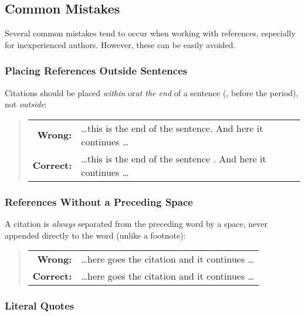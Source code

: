\subsection{Common Mistakes}

Several common mistakes tend to occur when working with references, especially
for inexperienced authors. However, these can be easily avoided.

\subsubsection{Placing References Outside Sentences}

Citations should be placed \emph{within} or\emph{at the end} of a sentence (\ie, before the
period), not \emph{outside}:
%
\begin{quote}
	\begin{tabular}{rl}
		\textbf{Wrong:}  & \ldots this is the end of the sentence.
		\cite{Oetiker2021} And here it continues \ldots \\
		\textbf{Correct:} & \ldots this is the end of the sentence
		\cite{Oetiker2021}. And here it continues \ldots
	\end{tabular}
\end{quote}

\subsubsection{References Without a Preceding Space}

A citation is \emph{always} separated from the preceding word by a space, never
appended directly to the word (unlike a footnote):
%
\begin{quote}
	\begin{tabular}{rl}
		\textbf{Wrong:}  & \ldots here goes the
		citation\cite{Oetiker2021} and it continues \ldots  \\
		\textbf{Correct:} & \ldots here goes the citation
		\cite{Oetiker2021} and it continues \ldots
	\end{tabular}
\end{quote}

\subsubsection{Literal Quotes}

